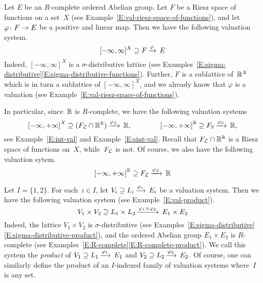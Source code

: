 %
%
\begin{ex}
\label{E:riesz-function-space-simple-system}
Let $E$ be an $R$-complete ordered Abelian group.
Let $F$ be a Riesz space of functions on a set~$X$
(see Example~\ref{E:val-riesz-space-of-functions}),
and let $\varphi\colon F\rightarrow E$ be a positive and linear map.
Then we have the following  valuation system.
\begin{equation*}
[-\infty,\infty]^X \supseteq F\,\smash{\xrightarrow{\varphi}\,E}
\end{equation*}
Indeed, 
$[-\infty,\infty]^X$ is a $\sigma$-distributive
lattice 
(see Examples~\ref{E:sigma-distributive}\ref{E:sigma-distributive-functions}).
Further, $F$ is a sublattice of~$\mathbb{R}^X$
which is in turn a sublattice of $[-\infty,\infty]^X$,
and we already know that
$\varphi$ is a valuation (see Example~\ref{E:val-riesz-space-of-functions}).

In particular, since~$\mathbb{R}$ is $R$-complete,
we have the following valuation systems
\begin{equation*}
{[-\infty,+\infty]}^X \supseteq (F_{\mathcal{L}}\cap\mathbb{R}^{\mathbb{R}})\,\smash{\xrightarrow{\varphi_{\mathcal{L}}}\,\mathbb{R}},
\qquad\qquad
{[-\infty,+\infty]}^{\mathbb{R}} \supseteq F_{\mathrm{S}}\,\smash{\xrightarrow{\varphi_{\mathrm{S}}}\,\mathbb{R}},
\end{equation*}
see Example~\ref{E:int-val} and Example~\ref{E:sint-val}.
Recall that $F_{\mathcal{L}}\cap \mathbb{R}^{\mathbb{R}}$ is a Riesz space of functions on~$X$,
while~$F_{\mathcal{L}}$ is not.
Of course,
we also have the following valuation sytem.
\begin{equation*}
{[-\infty,+\infty]}^{\mathbb{R}} \supseteq F_{\mathcal{L}}\,\smash{\xrightarrow{\varphi_{\mathcal{L}}}\,\mathbb{R}}
\end{equation*}
\end{ex}

\begin{ex}
Let $I=\{1,2\}$.
For each~$i\in I$,
let $V_i \supseteq L_i\,\smash{\xrightarrow{\varphi_i}\,E_i}$
be a  valuation system.
Then we have the following  valuation system
(see Example~\ref{E:val-product}).
\begin{equation*}
V_1\times V_2 \supseteq L_1 \times L_2\,\smash{\xrightarrow{\varphi_1 \times \varphi_2}\,E_1 \times E_2}
\end{equation*}
Indeed,
the lattice
$V_1\times V_2$ is $\sigma$-distributive
(see Examples~\ref{E:sigma-distributive}\ref{E:sigma-distributive-product}),
and the ordered Abelian group $E_1\times E_2$ is $R$-complete
(see Examples~\ref{E:R-complete}\ref{E:R-complete-product}).
We call this system
the \emph{product} of $V_1 \supseteq L_1\,\smash{\xrightarrow{\varphi_1}\,E_1}$
and $V_2 \supseteq L_2\,\smash{\xrightarrow{\varphi_2}\,E_2}$.
Of course,
one can similarly define the product of 
an $I$-indexed family of valuation systems
where~$I$ is any set.
\end{ex}


